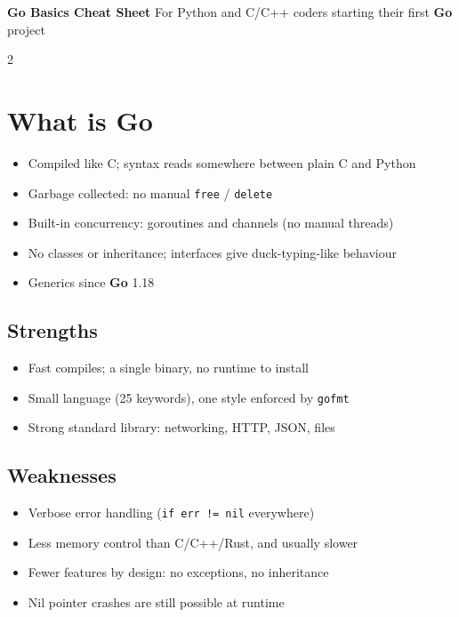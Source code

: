\documentclass[9pt]{extarticle}
\newcommand{\Go}{\textbf{\textcolor{goblue}{Go}}}
\newcommand{\kw}[1]{\textcolor{accent}{\texttt{#1}}}
\begin{document}
{\color{ink}\LARGE\bfseries \Go{} Basics Cheat Sheet}\hfill
{\small For Python and C/C++ coders starting their first \Go{} project}\par
\vspace{1pt}{\color{rule}\rule{\linewidth}{0.6pt}}
\vspace{-4pt}

\begin{multicols*}{2}
\raggedright

\section{What is Go}
\begin{itemize}
  \item Compiled like C; syntax reads somewhere between plain C and Python
  \item Garbage collected: no manual \kw{free} / \kw{delete}
  \item Built-in concurrency: goroutines and channels (no manual threads)
  \item No classes or inheritance; interfaces give duck-typing-like behaviour
  \item Generics since \Go{} 1.18
\end{itemize}
\subsection{Strengths}
\begin{itemize}
  \item Fast compiles; a single binary, no runtime to install
  \item Small language (25 keywords), one style enforced by \kw{gofmt}
  \item Strong standard library: networking, HTTP, JSON, files
\end{itemize}
\subsection{Weaknesses}
\begin{itemize}
  \item Verbose error handling (\kw{if err != nil} everywhere)
  \item Less memory control than C/C++/Rust, and usually slower
  \item Fewer features by design: no exceptions, no inheritance
  \item Nil pointer crashes are still possible at runtime
\end{itemize}


\end{multicols*}
\end{document}
